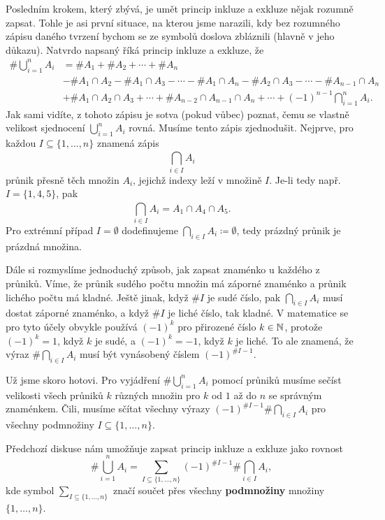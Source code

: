 Posledním krokem, který zbývá, je umět princip inkluze a exkluze nějak rozumně
zapsat. Tohle je asi první situace, na kterou jsme narazili, kdy bez rozumného
zápisu daného tvrzení bychom se ze symbolů doslova zbláznili (hlavně v jeho
důkazu). Natvrdo napsaný říká princip inkluze a exkluze, že
\begin{align*}
 \# \bigcup_{i=1}^{n} A_i &= \# A_1 + \# A_2 + \cdots + \# A_n\\
 &- \# A_1 \cap A_2 - \# A_1 \cap A_3 - \cdots - \# A_1 \cap A_n - \# A_2
 \cap A_3 - \cdots - \# A_{n-1} \cap A_n\\
 &+ \# A_1 \cap A_2 \cap A_3 + \cdots + \# A_{n-2} \cap A_{n-1} \cap A_n +
 \cdots + (-1)^{n-1} \bigcap_{i=1}^{n} A_i.
\end{align*}
Jak sami vidíte, z tohoto zápisu je sotva (pokud vůbec) poznat, čemu se vlastně
velikost sjednocení $\bigcup_{i=1}^{n} A_i$ rovná. Musíme tento zápis
zjednodušit. Nejprve, pro každou $I \subseteq \{1,\ldots,n\}$ znamená zápis
\[
 \bigcap_{i \in I}^{} A_i
\]
průnik přesně těch množin $A_i$, jejichž indexy leží v množině $I$. Je-li tedy
např. $I = \{1,4,5\}$, pak
\[
 \bigcap_{i  \in I}^{} A_i = A_1 \cap A_4 \cap A_5.
\]
Pro extrémní případ $I = \emptyset$ dodefinujeme $\bigcap_{i \in  I}^{}A_i
\coloneqq \emptyset$, tedy prázdný průnik je prázdná množina.

Dále si rozmyslíme jednoduchý způsob, jak zapsat znaménko u každého z průniků.
Víme, že průnik sudého počtu množin má záporné znaménko a průnik lichého počtu
má kladné. Ještě jinak, když $\# I$ je sudé číslo, pak $\bigcap_{i \in  I}^{}
A_i$ musí dostat záporné znaménko, a když $\# I$ je liché číslo, tak kladné. V
matematice se pro tyto účely obvykle používá $(-1)^{k}$ pro přirozené číslo $k
\in \mathbb{N}$, protože $(-1)^{k}=1$, když $k$ je sudé, a $(-1)^{k} = -1$, když $k$ je
liché. To ale znamená, že výraz $\# \bigcap_{i \in  I}^{} A_i$ musí být
vynásobený číslem $(-1)^{\# I-1}$.

Už jsme skoro hotovi. Pro vyjádření $\# \bigcup_{i=1}^{n} A_i$ pomocí průniků
musíme sečíst velikosti všech průniků $k$ různých množin pro $k$ od $1$ až do
$n$ se správným znaménkem. Čili, musíme sčítat všechny výrazy $(-1)^{\# I - 1}\#
\bigcap_{i \in  I}^{} A_i$ pro všechny podmnožiny $I \subseteq \{1,\ldots,n\}$.

Předchozí diskuse nám umožňuje zapsat princip inkluze a exkluze jako rovnost
\[
 \# \bigcup_{i=1}^{n} A_i = \sum_{I \subseteq \{1,\ldots,n\}}^{} (-1)^{\# I - 1}
 \# \bigcap_{i \in  I}^{} A_i,
\]
kde symbol $\sum_{I \subseteq \{1,\ldots,n\}}^{}$ značí součet přes všechny
\textbf{podmnožiny} množiny $\{1,\ldots,n\}$.


